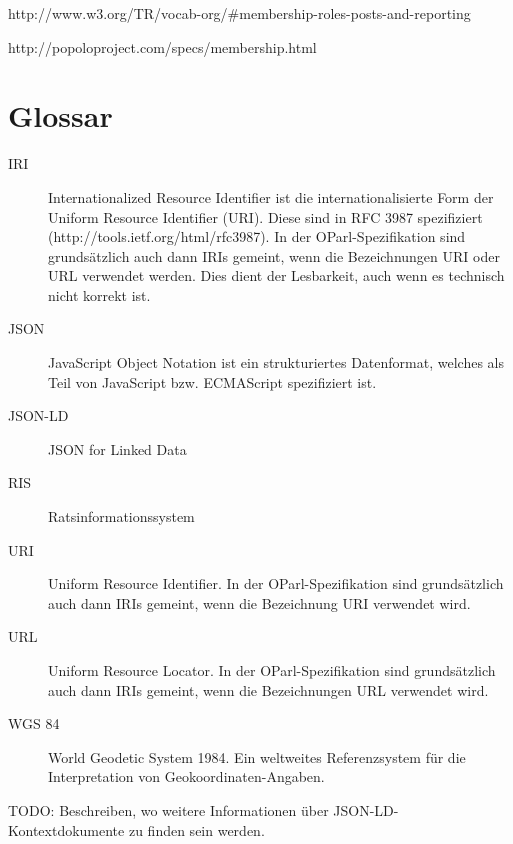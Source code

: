 \documentclass[,a4paper]{article}
\begin{document}
http://www.w3.org/TR/vocab-org/\#membership-roles-posts-and-reporting

http://popoloproject.com/specs/membership.html

\section{Glossar}\label{glossar}

\begin{description}
\item[IRI]
Internationalized Resource Identifier ist die internationalisierte Form
der Uniform Resource Identifier (URI). Diese sind in RFC 3987
spezifiziert (http://tools.ietf.org/html/rfc3987). In der
OParl-Spezifikation sind grundsätzlich auch dann IRIs gemeint, wenn die
Bezeichnungen URI oder URL verwendet werden. Dies dient der Lesbarkeit,
auch wenn es technisch nicht korrekt ist.
\item[JSON]
JavaScript Object Notation ist ein strukturiertes Datenformat, welches
als Teil von JavaScript bzw. ECMAScript spezifiziert ist.
\item[JSON-LD]
JSON for Linked Data
\item[RIS]
Ratsinformationssystem
\item[URI]
Uniform Resource Identifier. In der OParl-Spezifikation sind
grundsätzlich auch dann IRIs gemeint, wenn die Bezeichnung URI verwendet
wird.
\item[URL]
Uniform Resource Locator. In der OParl-Spezifikation sind grundsätzlich
auch dann IRIs gemeint, wenn die Bezeichnungen URL verwendet wird.
\item[WGS 84]
World Geodetic System 1984. Ein weltweites Referenzsystem für die
Interpretation von Geokoordinaten-Angaben.
\end{description}


TODO: Beschreiben, wo weitere Informationen über
JSON-LD-Kontextdokumente zu finden sein werden.
\end{document}
